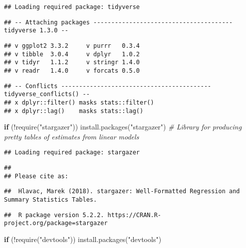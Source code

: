 \documentclass[
]{book}
\newenvironment{Shaded}{\begin{snugshade}}{\end{snugshade}}
\newcommand{\CommentTok}[1]{\textcolor[rgb]{0.56,0.35,0.01}{\textit{#1}}}
\newcommand{\ControlFlowTok}[1]{\textcolor[rgb]{0.13,0.29,0.53}{\textbf{#1}}}
\newcommand{\FunctionTok}[1]{\textcolor[rgb]{0.00,0.00,0.00}{#1}}
\newcommand{\NormalTok}[1]{#1}
\newcommand{\SpecialCharTok}[1]{\textcolor[rgb]{0.00,0.00,0.00}{#1}}
\newcommand{\StringTok}[1]{\textcolor[rgb]{0.31,0.60,0.02}{#1}}
\begin{document}
\begin{verbatim}
## Loading required package: tidyverse
\end{verbatim}

\begin{verbatim}
## -- Attaching packages --------------------------------------- tidyverse 1.3.0 --
\end{verbatim}

\begin{verbatim}
## v ggplot2 3.3.2     v purrr   0.3.4
## v tibble  3.0.4     v dplyr   1.0.2
## v tidyr   1.1.2     v stringr 1.4.0
## v readr   1.4.0     v forcats 0.5.0
\end{verbatim}

\begin{verbatim}
## -- Conflicts ------------------------------------------ tidyverse_conflicts() --
## x dplyr::filter() masks stats::filter()
## x dplyr::lag()    masks stats::lag()
\end{verbatim}

\begin{Shaded}
\begin{Highlighting}[]
\ControlFlowTok{if}\NormalTok{ (}\SpecialCharTok{!}\FunctionTok{require}\NormalTok{(}\StringTok{"stargazer"}\NormalTok{)) }\FunctionTok{install.packages}\NormalTok{(}\StringTok{"stargazer"}\NormalTok{) }\CommentTok{\# Library for producing pretty tables of estimates from linear models}
\end{Highlighting}
\end{Shaded}

\begin{verbatim}
## Loading required package: stargazer
\end{verbatim}

\begin{verbatim}
## 
## Please cite as:
\end{verbatim}

\begin{verbatim}
##  Hlavac, Marek (2018). stargazer: Well-Formatted Regression and Summary Statistics Tables.
\end{verbatim}

\begin{verbatim}
##  R package version 5.2.2. https://CRAN.R-project.org/package=stargazer
\end{verbatim}

\begin{Shaded}
\begin{Highlighting}[]
\ControlFlowTok{if}\NormalTok{ (}\SpecialCharTok{!}\FunctionTok{require}\NormalTok{(}\StringTok{"devtools"}\NormalTok{)) }\FunctionTok{install.packages}\NormalTok{(}\StringTok{"devtools"}\NormalTok{)}
\end{Highlighting}
\end{Shaded}
\end{document}
